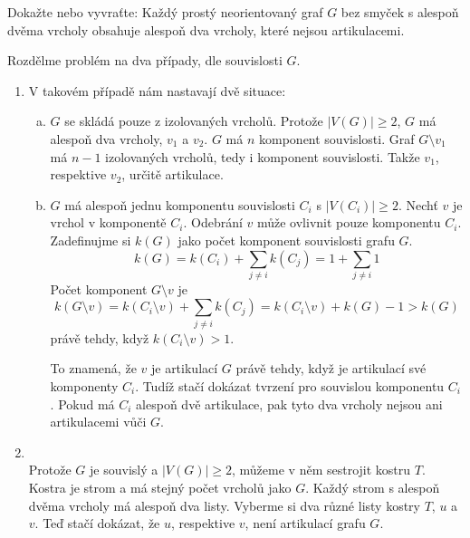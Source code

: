 \documentclass[11pt,a4paper]{article}
\begin{document}
\newpage

\begin{exercise}
Dokažte nebo vyvraťte: Každý prostý neorientovaný graf $G$ bez smyček s alespoň dvěma vrcholy obsahuje alespoň dva 
vrcholy, které nejsou artikulacemi.
\end{exercise}
\begin{solution}
Rozdělme problém na dva případy, dle souvislosti $G$.
\vspace{-1em}
\begin{enumerate}[1)]
    \item {} V takovém případě nám nastavají dvě situace:
    \begin{enumerate}[a)]
        \item $G$ se skládá pouze z izolovaných vrcholů. Protože $|V(G)| \geq 2$, $G$ má alespoň dva vrcholy, $v_1$ a 
        $v_2$. $G$ má $n$ komponent souvislosti. Graf $G \setminus v_1$ má $n-1$ izolovaných vrcholů, tedy i komponent 
        souvislosti. Takže $v_1$, respektive $v_2$, určitě  artikulace. 
        \item $G$ má alespoň jednu komponentu souvislosti $C_i$ s $|V(C_i)| \geq 2$. Nechť $v$ je vrchol v komponentě 
        $C_i$. Odebrání $v$ může ovlivnit pouze komponentu $C_i$. Zadefinujme si $k(G)$ jako počet komponent souvislosti 
        grafu $G$. 
        \begin{equation}
            k(G) = k(C_i) + \sum_{j \not= i}k(C_j) = 1 + \sum_{j \not= i}1
        \end{equation} 
        Počet komponent $G \setminus v$ je 
        \begin{equation}
            k(G \setminus v) = k(C_i \setminus v) + \sum_{j \not= i}k(C_j) = k(C_i \setminus v) + k(G) - 1 > k(G)
        \end{equation}
        právě tehdy, když $k(C_i \setminus v) > 1$.  
        
        To znamená, že $v$ je artikulací $G$ právě tehdy, když je artikulací své komponenty $C_i$. Tudíž stačí dokázat 
        tvrzení pro souvislou komponentu $C_i$. Pokud má $C_i$ alespoň dvě artikulace, pak tyto dva vrcholy 
        nejsou ani artikulacemi vůči $G$.
    \end{enumerate}
    \item {} \\
    Protože $G$ je souvislý a $|V(G)| \geq 2$, můžeme v něm sestrojit kostru $T$. Kostra je strom a má stejný počet
    vrcholů jako $G$. Každý strom s alespoň dvěma vrcholy má alespoň dva listy. Vyberme si dva různé listy kostry $T$, 
    $u$ a $v$. Teď stačí dokázat, že $u$, respektive $v$, není artikulací grafu $G$.


\end{enumerate}
\end{solution}
\end{document}
